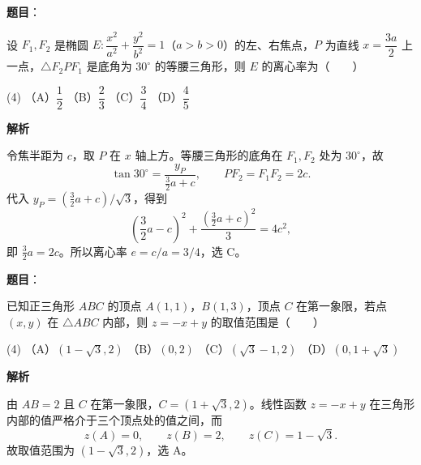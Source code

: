 \begin{answer}

\textbf{题目}：

设 $F_1,F_2$ 是椭圆 $E:\dfrac{x^2}{a^2}+\dfrac{y^2}{b^2}=1$（$a>b>0$）的左、右焦点，$P$ 为直线 $x=\dfrac{3a}{2}$ 上一点，$\triangle F_2PF_1$ 是底角为 $30^\circ$ 的等腰三角形，则 $E$ 的离心率为\mbox{（　　）}

\begin{gkopts}(4)
\task （A）$\dfrac12$
\task （B）$\dfrac23$
\task （C）$\dfrac34$
\task （D）$\dfrac45$
\end{gkopts}

\textbf{解析}

令焦半距为 $c$，取 $P$ 在 $x$ 轴上方。等腰三角形的底角在 $F_1,F_2$ 处为 $30^\circ$，故
\nopagebreak[4]
\[
\tan30^\circ=\frac{y_P}{\frac32a+c},\qquad
PF_2=F_1F_2=2c.
\]
代入 $y_P=(\frac32a+c)/\sqrt3$，得到
\nopagebreak[4]
\[
\left(\frac32a-c\right)^2+\frac{(\frac32a+c)^2}{3}=4c^2,
\]
即 $\frac32a=2c$。所以离心率 $e=c/a=3/4$，选 C。


\end{answer}
\begin{answer}

\textbf{题目}：

已知正三角形 $ABC$ 的顶点 $A(1,1)$，$B(1,3)$，顶点 $C$ 在第一象限，若点 $(x,y)$ 在 $\triangle ABC$ 内部，则 $z=-x+y$ 的取值范围是\mbox{（　　）}

\begin{gkopts}(4)
\task （A）$(1-\sqrt3,2)$
\task （B）$(0,2)$
\task （C）$(\sqrt3-1,2)$
\task （D）$(0,1+\sqrt3)$
\end{gkopts}

\textbf{解析}

由 $AB=2$ 且 $C$ 在第一象限，$C=(1+\sqrt3,2)$。线性函数 $z=-x+y$ 在三角形内部的值严格介于三个顶点处的值之间，而
\nopagebreak[4]
\[
z(A)=0,\qquad z(B)=2,\qquad z(C)=1-\sqrt3.
\]
故取值范围为 $(1-\sqrt3,2)$，选 A。


\end{answer}
